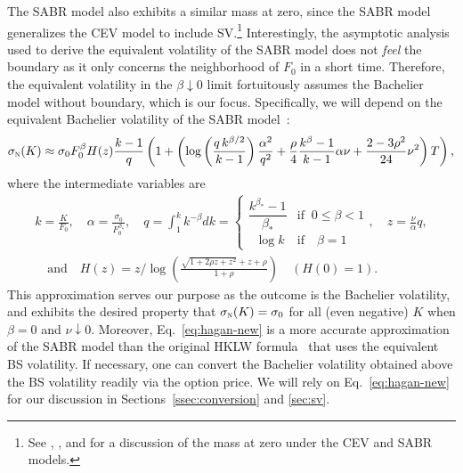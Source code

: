 \documentclass[a4paper,review]{elsarticle}
\newcommand{\qtext}[2][\quad]{#1\text{#2}#1}
\newcommand{\sigman}{\sigma_\textsc{n}}
\newcommand{\betac}{\beta_\ast}
\newcommand{\vov}{\nu}
\begin{document}
The SABR model also exhibits a similar mass at zero, since the SABR model generalizes the CEV model to include SV.\footnote{See \citet{yang2018survival}, \citet{gulisashvili2018mass}, and \citet{choi2021sabrcev,choi2021note} for a discussion of the mass at zero under the CEV and SABR models.}
Interestingly, the asymptotic analysis used to derive the equivalent volatility of the SABR model does not \textit{feel} the boundary as it only concerns the neighborhood of $F_0$ in a short time. Therefore, the equivalent volatility in the $\beta\downarrow 0$ limit fortuitously assumes the Bachelier model without boundary, which is our focus. Specifically, we will depend on the equivalent Bachelier volatility of the SABR model~\citep[Eq.~(14)]{hagan2014arbfree}:
\begin{equation} \label{eq:hagan-new}
\sigman(K) \approx \sigma_0 F_0^\beta H(z) \frac{k-1}{q} \left(1 + \left(
\log \left(\frac{q\,k^{\beta/2}}{k-1}\right) \frac{\alpha^2}{q^2} + \frac{\rho}{4} \frac{k^\beta-1}{k-1} \alpha\vov + \frac{2-3\rho^2}{24} \vov^2
\right)T\right),
\end{equation}
where the intermediate variables are 
\begin{gather*}
k = \frac{K}{F_0},\quad \alpha = \frac{\sigma_0}{F_0^{\betac}}, \quad
q = \int_1^k k^{-\beta}dk = 
\begin{cases}
\dfrac{k^{\betac}-1}{\betac} & \text{if}\;\; 0\le \beta < 1 \\
\;\;\log k & \text{if}\quad \beta=1
\end{cases}, \quad
z = \frac{\vov}{\alpha}q,\\
\qtext{and} H(z) = z \Big/ \log\left( \frac{\sqrt{1+2\rho z+z^2}+z+\rho}{1+\rho} \right) \quad (H(0)=1).
\end{gather*}
This approximation serves our purpose as the outcome is the Bachelier volatility, and exhibits the desired property that $\sigman(K) = \sigma_0$ for all (even negative) $K$ when $\beta=0$ and $\vov\downarrow 0$. Moreover, Eq.~\eqref{eq:hagan-new} is a more accurate approximation of the SABR model than the original HKLW formula~\citep{hagan2002sabr} that uses the equivalent BS volatility. If necessary, one can convert the Bachelier volatility obtained above the BS volatility readily via the option price. We will rely on Eq.~\eqref{eq:hagan-new} for our discussion in Sections~\ref{ssec:conversion} and \ref{sec:sv}.
\end{document}
